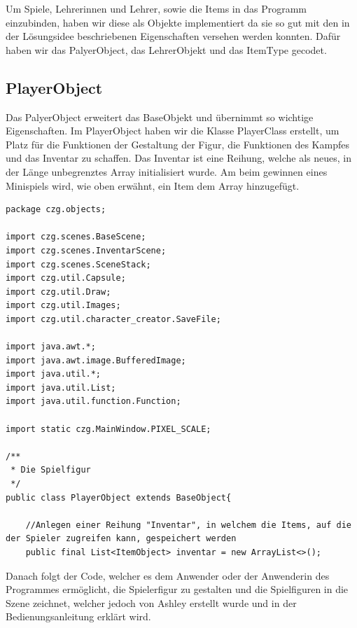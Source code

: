 
Um Spiele, Lehrerinnen und Lehrer, sowie die Items in das Programm einzubinden, haben wir diese als Objekte implementiert da sie so gut mit den in der Lösungsidee beschriebenen Eigenschaften versehen werden konnten. Dafür haben wir das PalyerObject, das LehrerObjekt und das ItemType gecodet.\\
\subsection{PlayerObject}
Das PalyerObject erweitert das BaseObjekt und übernimmt so wichtige Eigenschaften. Im PlayerObject haben wir die Klasse PlayerClass erstellt, um Platz für die Funktionen der Gestaltung der Figur, die Funktionen des Kampfes und das Inventar zu schaffen. Das Inventar ist eine Reihung, welche als neues, in der Länge unbegrenztes Array initialisiert wurde. Am beim gewinnen eines Minispiels wird, wie oben erwähnt, ein Item dem Array hinzugefügt.\\

\begin{lstlisting}package czg.objects;

import czg.scenes.BaseScene;
import czg.scenes.InventarScene;
import czg.scenes.SceneStack;
import czg.util.Capsule;
import czg.util.Draw;
import czg.util.Images;
import czg.util.character_creator.SaveFile;

import java.awt.*;
import java.awt.image.BufferedImage;
import java.util.*;
import java.util.List;
import java.util.function.Function;

import static czg.MainWindow.PIXEL_SCALE;

/**
 * Die Spielfigur
 */
public class PlayerObject extends BaseObject{

    //Anlegen einer Reihung "Inventar", in welchem die Items, auf die der Spieler zugreifen kann, gespeichert werden
    public final List<ItemObject> inventar = new ArrayList<>();

\end{lstlisting}

Danach folgt der Code, welcher es dem Anwender oder der Anwenderin des Programmes ermöglicht, die Spielerfigur zu gestalten und die Spielfiguren in die Szene zeichnet, welcher jedoch von Ashley erstellt wurde und in der Bedienungsanleitung erklärt wird.\\

